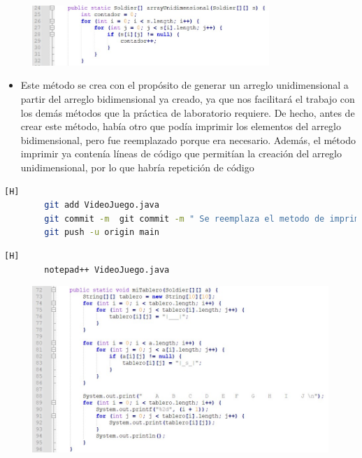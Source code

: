 \documentclass{article}
\begin{document}
		
	\begin{figure}[H]
		\centering
		\includegraphics[width=0.8\textwidth,keepaspectratio]{img/3.jpg}
	\end{figure}	
		
		
	\begin{itemize}	
		\item Este método se crea con el propósito de generar un arreglo unidimensional a partir del arreglo bidimensional ya creado, ya que nos facilitará el trabajo con los demás métodos que la práctica de laboratorio requiere. De hecho, antes de crear este método, había otro que podía imprimir los elementos del arreglo bidimensional, pero fue reemplazado porque era necesario. Además, el método imprimir ya contenía líneas de código que permitían la creación del arreglo unidimensional, por lo que habría repetición de código
	\end{itemize}		
		
		
		
	\begin{lstlisting}[language=bash,caption={Commit:  Se reemplaza el metodo de imprimir por el de generar arreglo unidimensional para poder trabajar los demas metodos }][H]
		git add VideoJuego.java
		git commit -m  git commit -m " Se reemplaza el metodo de imprimir por el de generar arreglo unidimensional para poder trabajar los demas metodos"
		git push -u origin main
	\end{lstlisting}
		
		
		
		
	\begin{lstlisting}[language=bash,caption={ Método para imprimir el tablero con la posición de cada soldado }][H]
		notepad++ VideoJuego.java
	\end{lstlisting}
		
	\begin{figure}[H]
		\centering
		\includegraphics[width=1\textwidth,keepaspectratio]{img/4.jpg}
	\end{figure}	
		
\end{document}
